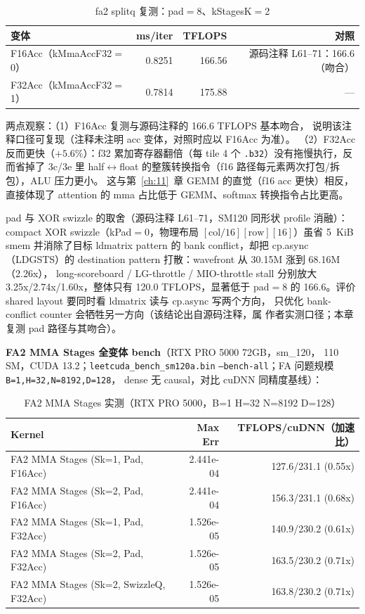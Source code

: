 \begin{table}[htbp]
\centering
\caption{fa2 splitq 复测：pad$=$8、kStagesK$=$2}
\label{tab:16-bench}
\begin{tabular}{lrrr}
\toprule
变体 & ms/iter & TFLOPS & 对照 \\
\midrule
F16Acc（kMmaAccF32$=$0） & 0.8251 & 166.56 & 源码注释 L61--71：166.6（吻合） \\
F32Acc（kMmaAccF32$=$1） & 0.7814 & 175.88 & — \\
\bottomrule
\end{tabular}
\end{table}

两点观察：（1）F16Acc 复测与源码注释的 166.6 TFLOPS 基本吻合，
说明该注释口径可复现（注释未注明 acc 变体，对照时应以 F16Acc 为准）。
（2）F32Acc 反而更快（$+5.6\%$）：f32 累加寄存器翻倍（每 tile
4 个 \texttt{.b32}）没有拖慢执行，反而省掉了 3c/3e 里 half$\leftrightarrow$float
的整簇转换指令（f16 路径每元素两次打包/拆包），ALU 压力更小。
这与第~\ref{ch:11}~章 GEMM 的直觉（f16 acc 更快）相反，直接体现了
attention 的 mma 占比低于 GEMM、softmax 转换指令占比更高。

pad 与 XOR swizzle 的取舍（源码注释 L61--71，SM120 同形状
profile 消融）：compact XOR swizzle（kPad$=$0，物理布局
$[\mathrm{col}/16][\mathrm{row}][16]$）虽省 5~KiB smem 并消除了目标
ldmatrix pattern 的 bank conflict，却把 cp.async（LDGSTS）的
destination pattern 打散：wavefront 从 30.15M 涨到 68.16M（2.26x），
long-scoreboard / LG-throttle / MIO-throttle stall 分别放大
3.25x/2.74x/1.60x，整体只有 120.0 TFLOPS，显著低于 pad$=$8 的
166.6。评价 shared layout 要同时看 ldmatrix 读与 cp.async 写两个方向，
只优化 bank-conflict counter 会牺牲另一方向（该结论出自源码注释，属
作者实测口径；本章复测 pad 路径与其吻合）。

\textbf{FA2 MMA Stages 全变体 bench}（RTX PRO 5000 72GB，sm\_120，
110 SM，CUDA 13.2；\texttt{leetcuda\_\allowbreak{}bench\_\allowbreak{}sm120a.\allowbreak{}bin}
\texttt{--bench-all}；FA 问题规模
\texttt{B=\allowbreak{}1,\allowbreak{}H=\allowbreak{}32,\allowbreak{}N=\allowbreak{}8192,\allowbreak{}D=\allowbreak{}128}，
dense 无 causal，对比 cuDNN 同精度基线）：

\begin{table}[H]
\centering
\caption{FA2 MMA Stages 实测（RTX PRO 5000，B=1 H=32 N=8192 D=128）}
\label{tab:ch16-perf}
\footnotesize
\setlength{\tabcolsep}{4pt}
\begin{tabular}{lrr}
\toprule
Kernel & Max Err & TFLOPS/cuDNN（加速比） \\
\midrule
FA2 MMA Stages (Sk=1, Pad, F16Acc) & 2.441e-04 & 127.6/231.1 (0.55x) \\
FA2 MMA Stages (Sk=2, Pad, F16Acc) & 2.441e-04 & 156.3/231.1 (0.68x) \\
FA2 MMA Stages (Sk=1, Pad, F32Acc) & 1.526e-05 & 140.9/230.2 (0.61x) \\
FA2 MMA Stages (Sk=2, Pad, F32Acc) & 1.526e-05 & 163.5/230.2 (0.71x) \\
FA2 MMA Stages (Sk=2, SwizzleQ, F32Acc) & 1.526e-05 & 163.8/230.2 (0.71x) \\
\bottomrule
\end{tabular}
\end{table}


